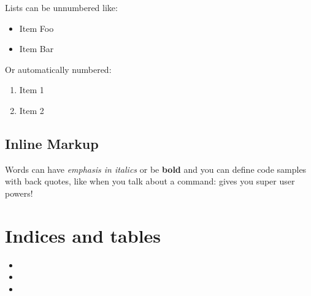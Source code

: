 \documentclass[a4paper,12pt,spanish]{sphinxmanual}
\begin{document}
Lists can be unnumbered like:
\begin{itemize}
\item {} 
Item Foo

\item {} 
Item Bar

\end{itemize}

Or automatically numbered:
\begin{enumerate}
\item {} 
Item 1

\item {} 
Item 2

\end{enumerate}


\section{Inline Markup}
\label{example:inline-markup}
Words can have \emph{emphasis in italics} or be \textbf{bold} and you can define
code samples with back quotes, like when you talk about a command: 
gives you super user powers!


\chapter{Indices and tables}
\label{index:indices-and-tables}\begin{itemize}
\item {} 

\item {} 

\item {} 

\end{itemize}



\renewcommand{\indexname}{Índice}
\printindex
\end{document}
